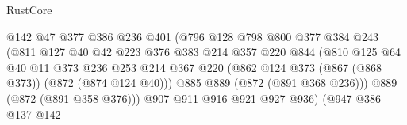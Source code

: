 \begin{lexlean}{RustCore}
\begin{coremodule}
                                      @142
                                      @47
                                      @377
                                      @386
                                      @236
                                      @401
                                      (@796
                                        @128
                                        @798
                                        @800
                                        @377
                                        @384
                                        @243
                                        (@811
                                          @127
                                          @40
                                          @42
                                          @223
                                          @376
                                          @383
                                          @214
                                          @357
                                          @220
                                          @844
                                          (@810
                                            @125
                                            @64
                                            @40
                                            @11
                                            @373
                                            @236
                                            @253
                                            @214
                                            @367
                                            @220
                                            (@862
                                              @124
                                              @373
                                              (@867 (@868 @373))
                                              (@872 (@874 @124 @40)))
                                            @885
                                            @889
                                            (@872 (@891 @368 @236)))
                                          @889
                                          (@872 (@891 @358 @376)))
                                        @907
                                        @911
                                        @916
                                        @921
                                        @927
                                        @936)
                                      (@947
                                        @386
                                        @137
                                        @142

\end{coremodule}
\end{lexlean}
